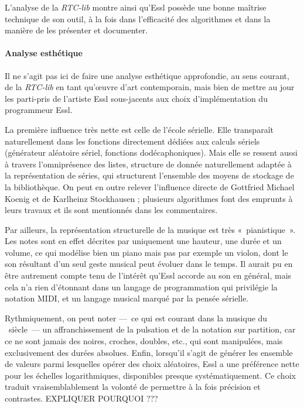 \documentclass[a4paper,12pt]{article}
\newcommand{\guill}[1]{«~#1~»}
\begin{document}
L'analyse de la \emph{RTC-lib} montre ainsi qu'Essl possède une bonne maîtrise technique de son outil, à la fois dans l'efficacité des algorithmes et dans la manière de les présenter et documenter.

\paragraph{Analyse esthétique \\}

Il ne s'agit pas ici de faire une analyse esthétique approfondie, au sens courant, de la \emph{RTC-lib} en tant qu'œuvre d'art contemporain, mais bien de mettre au jour les parti-pris de l'artiste Essl sous-jacents aux choix d'implémentation du programmeur Essl.

La première influence très nette est celle de l'école sérielle. Elle transparaît naturellement dans les fonctions directement dédiées aux calculs sériels (générateur aléatoire sériel, fonctions dodécaphoniques). Mais elle se ressent aussi à travers l'omniprésence des listes, structure de donnée naturellement adaptée à la représentation de séries, qui structurent l'ensemble des moyens de stockage de la bibliothèque. On peut en outre relever l'influence directe de Gottfried Michael Koenig et de Karlheinz Stockhausen ; plusieurs algorithmes font des emprunts à leurs travaux et ils sont mentionnés dans les commentaires.

Par ailleurs, la représentation structurelle de la musique est très \guill{pianistique}. Les notes sont en effet décrites par uniquement une hauteur, une durée et un volume, ce qui modélise bien un piano mais pas par exemple un violon, dont le son résultant d'un seul geste musical peut évoluer dans le temps. Il aurait pu en être autrement compte tenu de l'intérêt qu'Essl accorde au son en général, mais cela n'a rien d'étonnant dans un langage de programmation qui privilégie la notation MIDI, et un langage musical marqué par la pensée sérielle.

Rythmiquement, on peut noter ---~ce qui est courant dans la musique du \XXe~siècle~--- un affranchissement de la pulsation et de la notation sur partition, car ce ne sont jamais des noires, croches, doubles, etc., qui sont manipulées, mais exclusivement des durées absolues. Enfin, lorsqu'il s'agit de générer les ensemble de valeurs parmi lesquelles opérer des choix aléatoires, Essl a une préférence nette pour les échelles logarithmiques, disponibles presque systématiquement. Ce choix traduit vraisemblablement la volonté de permettre à la fois précision et contrastes. EXPLIQUER POURQUOI ???
\end{document}
